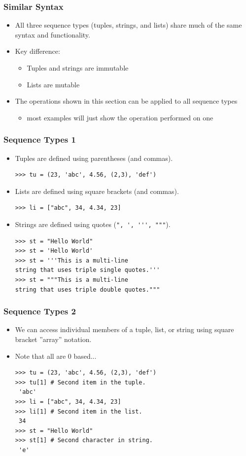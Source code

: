 \documentclass[12pt,handout]{beamer}
\newcommand{\code}[1]{\lstinline{#1}}
\begin{document}
\begin{frame}[fragile]
\frametitle{Similar Syntax}
\begin{itemize}
\item All three sequence types (tuples, strings, and lists)
share much of the same syntax and functionality.
\item Key difference:
\begin{itemize}
\item Tuples and strings are immutable
\item Lists are mutable
\end{itemize}
\item The operations shown in this section can be
applied to all sequence types
\begin{itemize}
\item most examples will just show the operation
performed on one
\end{itemize}
\end{itemize}
\end{frame}

\begin{frame}[fragile]
\frametitle{Sequence Types 1}
\begin{itemize}
\item Tuples are defined using parentheses (and commas).
\small{
\begin{verbatim}
>>> tu = (23, 'abc', 4.56, (2,3), 'def')
\end{verbatim}
}
\item Lists are defined using square brackets (and commas).
\small{
\begin{verbatim}
>>> li = ["abc", 34, 4.34, 23]
\end{verbatim}
}
\item Strings are defined using quotes (\code{", ', ''', """}).
\small{
\begin{verbatim}
>>> st = "Hello World"
>>> st = 'Hello World'
>>> st = '''This is a multi-line
string that uses triple single quotes.'''
>>> st = """This is a multi-line
string that uses triple double quotes."""
\end{verbatim}
}
\end{itemize}
\end{frame}


\begin{frame}[fragile]
\frametitle{Sequence Types 2}
\begin{itemize}
\item We can access individual members of a tuple, list, or string
  using square bracket ''array'' notation.
\item Note that all are 0 based...
\small{
\begin{verbatim}
>>> tu = (23, 'abc', 4.56, (2,3), 'def')
>>> tu[1] # Second item in the tuple.
 'abc'
>>> li = ["abc", 34, 4.34, 23]
>>> li[1] # Second item in the list.
 34
>>> st = "Hello World"
>>> st[1] # Second character in string.
 'e'
\end{verbatim}
}
\end{itemize}
\end{frame}
\end{document}
